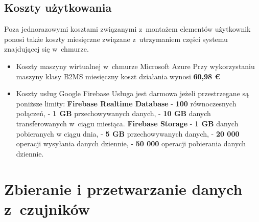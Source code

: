 \documentclass[polish,bachelor,a4paper,oneside]{ppfcmthesis}
\begin{document}
    \section{Koszty użytkowania}
    Poza jednorazowymi kosztami związanymi z~montażem elementów użytkownik ponosi także koszty miesięczne związane z~utrzymaniem części systemu znajdującej się w~chmurze.
    \begin{itemize}
        \item Koszty maszyny wirtualnej w~chmurze Microsoft Azure \newline
        Przy wykorzystaniu maszyny klasy B2MS miesięczny koszt działania wynosi \textbf{60,98 \euro}
        \item Koszty usług Google Firebase\newline
        Usługa jest darmowa jeżeli przestrzegane są poniższe limity:
        \subitem \textbf{Firebase Realtime Database}
        \subsubitem - \textbf{100} równoczesnych połączeń,
        \subsubitem - \textbf{1 GB} przechowywanych danych,
        \subsubitem - \textbf{10 GB} danych transferowanych w~ciągu miesiąca.
        \subitem \textbf{Firebase Storage}
        \subsubitem - \textbf{1 GB} danych pobieranych w ciągu dnia,
        \subsubitem - \textbf{5 GB} przechowywanych danych,
        \subsubitem - \textbf{20 000} operacji wysyłania danych dziennie,
        \subsubitem - \textbf{50 000} operacji pobierania danych dziennie.
    \end{itemize}

    \chapter{Zbieranie i przetwarzanie danych z~czujników}
\end{document}
